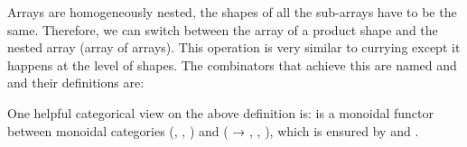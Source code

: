 Arrays are homogeneously nested, \ie{} the shapes of all the sub-arrays
have to be the same.  Therefore, we can switch between the array of a product
shape and the nested array (array of arrays).  This operation is very similar
to currying except it happens at the level of shapes.  The combinators that
achieve this are named  and  and their definitions are:

One helpful categorical view on the above definition is:
 is a monoidal functor between monoidal categories (, , \AC{[]})
and ( → , , ), which is ensured
by  and .



